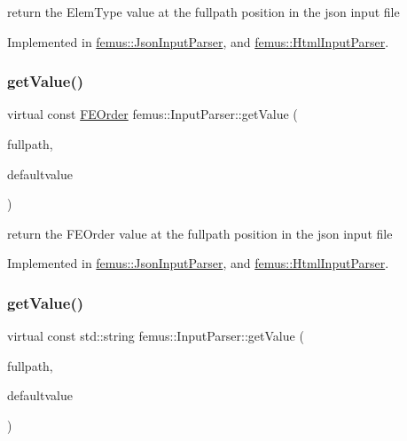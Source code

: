 return the Elem\+Type value at the {\ttfamily fullpath} position in the json input file 

Implemented in \mbox{\hyperlink{classfemus_1_1_json_input_parser_a00598393bac7b29e552167fb6d1c51f6}{femus\+::\+Json\+Input\+Parser}}, and \mbox{\hyperlink{classfemus_1_1_html_input_parser_a64208f42950a39ffe4bdf458af9e2c67}{femus\+::\+Html\+Input\+Parser}}.

\mbox{\label{classfemus_1_1_input_parser_afed8cdbe224355e291485f85dcf3a051}} 
\subsubsection{\texorpdfstring{get\+Value()}{getValue()}\hspace{0.1cm}{\footnotesize\ttfamily [4/6]}}
{\footnotesize\ttfamily virtual const \mbox{\hyperlink{_f_elem_type_enum_8hpp_a00ea9562f0dbb25e22bb3297d596e3ba}{F\+E\+Order}} femus\+::\+Input\+Parser\+::get\+Value (\begin{DoxyParamCaption}\item[{const std\+::string \&}]{fullpath,  }\item[{const \mbox{\hyperlink{_f_elem_type_enum_8hpp_a00ea9562f0dbb25e22bb3297d596e3ba}{F\+E\+Order}}}]{defaultvalue }\end{DoxyParamCaption})\hspace{0.3cm}{\ttfamily [pure virtual]}}

return the F\+E\+Order value at the {\ttfamily fullpath} position in the json input file 

Implemented in \mbox{\hyperlink{classfemus_1_1_json_input_parser_a29fe53a616bd9326081bfa485fc7b455}{femus\+::\+Json\+Input\+Parser}}, and \mbox{\hyperlink{classfemus_1_1_html_input_parser_acbb5375b2cf0e05e663da942ce78496e}{femus\+::\+Html\+Input\+Parser}}.

\mbox{\label{classfemus_1_1_input_parser_afc1cace4dae0ea2878d1ddd586dc6a2e}} 
\subsubsection{\texorpdfstring{get\+Value()}{getValue()}\hspace{0.1cm}{\footnotesize\ttfamily [5/6]}}
{\footnotesize\ttfamily virtual const std\+::string femus\+::\+Input\+Parser\+::get\+Value (\begin{DoxyParamCaption}\item[{const std\+::string \&}]{fullpath,  }\item[{const std\+::string}]{defaultvalue }\end{DoxyParamCaption})\hspace{0.3cm}{\ttfamily [pure virtual]}}

